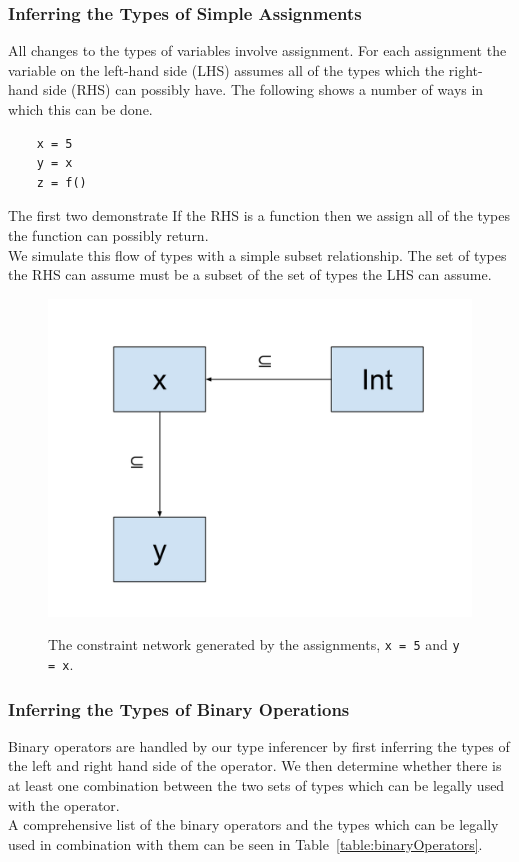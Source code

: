 \documentclass[12pt, titlepage]{article}
\begin{document}
\subsubsection{Inferring the Types of Simple Assignments}
All changes to the types of variables involve assignment. For each assignment the variable on the left-hand side (LHS) assumes all of the types which the right-hand side (RHS) can possibly have. The following shows a number of ways in which this can be done.
\begin{lstlisting}
	x = 5
	y = x
	z = f()
\end{lstlisting}
The first two demonstrate If the RHS is a function then we assign all of the types the function can possibly return. \\
We simulate this flow of types with a simple subset relationship. The set of types the RHS can assume must be a subset of the set of types the LHS can assume.

\begin{figure}
\centering
\includegraphics[scale=0.4]{images/assignment_constraint.pdf}
\label{figure:assignConstraint}
\caption{The constraint network generated by the assignments, \texttt{x = 5} and \texttt{y = x}.}
\end{figure}

\subsubsection{Inferring the Types of Binary Operations}
Binary operators are handled by our type inferencer by first inferring the types of the left and right hand side of the operator. We then determine whether there is at least one combination between the two sets of types which can be legally used with the operator. \\
A comprehensive list of the binary operators and the types which can be legally used in combination with them can be seen in Table~\ref{table:binaryOperators}.
\end{document}
